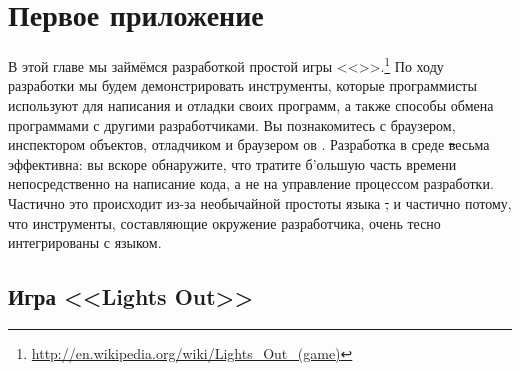 \documentclass[a4paper,10pt,twoside]{book}
\begin{document}
	\sloppy
\fi
\chapter{Первое приложение}

В этой главе мы займёмся разработкой простой игры <<>>.\footnote{\url{http://en.wikipedia.org/wiki/Lights_Out_(game)}}
По ходу разработки мы будем демонстрировать инструменты, которые программисты \pharo используют для написания и отладки своих программ, а также способы обмена программами с другими разработчиками. Вы познакомитесь с браузером, инспектором объектов, отладчиком и браузером ов .
Разработка в среде \st весьма эффективна: вы вскоре обнаружите, что тратите б'ольшую часть времени непосредственно на написание кода, а не на управление процессом разработки.
Частично это происходит из-за необычайной простоты языка \st, и частично потому, что инструменты, составляющие окружение разработчика, очень тесно интегрированы с языком.

\section{Игра <<Lights Out>>}
\end{document}
